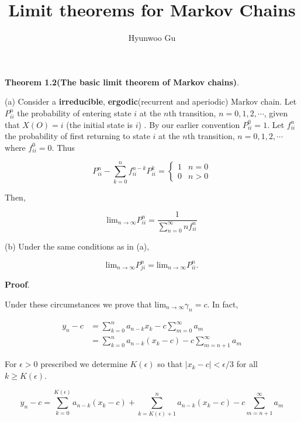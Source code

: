 \documentclass[12pt]{article}
\theoremstyle{nonumberbreak}
\begin{document}
\title{\textbf{Limit theorems for Markov Chains}}
\author{Hyunwoo Gu}
\date{}

\maketitle


\begin{theorem}
\textbf{Theorem 1.2(The basic limit theorem of Markov chains)}. 

(a) Consider a \textbf{irreducible}, \textbf{ergodic}(recurrent and aperiodic) Markov chain. Let $P_{ii}^n$ the probability of entering state $i$ at the $n$th transition, $n=0,1,2,\cdots$, given that $X(O) = i$ (the initial state is $i$) . By our earlier convention $P_{ii}^0 = 1$. Let $f_{ii}^n$ the probability of first returning to state $i$ at the $n$th transition, $n=0,1,2,\cdots$ where $f_{ii}^0 = 0$. Thus 

$$
P^n_{ii} - \sum_{k=0}^n f_{ii}^{n-k} P_{ii}^k = \begin{cases}
1 & n=0 \\ 
0 & n>0
\end{cases}
$$

Then,

$$
\mathrm{lim}_{n\to\infty} P_{ii}^n = \frac{1}{\sum_{n=0}^\infty n f_{ii}^n}
$$

(b) Under the same conditions as in (a), 

$$
\mathrm{lim}_{n\to\infty} P^n_{ji} = \mathrm{lim}_{n\to\infty} P_{ii}^n.
$$
\end{theorem}


\textbf{Proof}. 


Under these circumstances we prove that $\mathrm{lim}_{n\to\infty} \gamma_n = c$. In fact,

$$
\begin{aligned}
y_n - c &= \sum_{k=0}^n a_{n-k} x_k - c\sum_{m=0}^\infty a_m \\[8pt]
&= \sum_{k=0}^n a_{n-k} (x_k -c) - c \sum_{m=n+1}^\infty a_m
\end{aligned}
$$

For $\epsilon >0$ prescribed we determine $K(\epsilon)$ so that $\vert x_k - c \vert < \epsilon / 3$ for all $k \ge K(\epsilon)$. 

$$
y_n - c = \sum_{k=0}^{K(\epsilon)} a_{n-k} (x_k -c) + \sum_{k=K(\epsilon)+1}^n a_{n-k} (x_k -c) - c \sum_{m=n+1}^\infty a_m
$$
\end{document}
